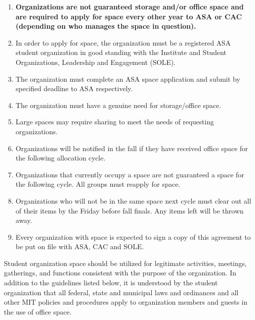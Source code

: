 \documentclass[12pt]{constitution}
\begin{document}
\begin{enumerate}
    \item \textbf{Organizations are not guaranteed storage and/or office space and are required to apply for
        space every other year to ASA or CAC (depending on who manages the space in question).}
    
    \item In order to apply for space, the organization must be a registered ASA student organization
        in good standing with the Institute and Student Organizations, Leadership and Engagement (SOLE).
    
    \item The organization must complete an ASA space application and submit by specified deadline to
        ASA respectively.

    \item The organization must have a genuine need for storage/office space.
    
    \item Large spaces may require sharing to meet the needs of requesting organizations.
    
    \item Organizations will be notified in the fall if they have received office space for the following
        allocation cycle.
    
    \item Organizations that currently occupy a space are not guaranteed a space for the following cycle.
        All groups must reapply for space.

    \item Organizations who will not be in the same space next cycle must clear out all of their items by
        the Friday before fall finals.
    Any items left will be thrown away.

    \item Every organization with space is expected to sign a copy of this agreement to be put on file
        with ASA, CAC and SOLE.
\end{enumerate}

Student organization space should be utilized for legitimate activities, meetings, gatherings, and functions consistent with the purpose of the organization. In addition to the guidelines listed below, it is understood by the student organization that all federal, state and municipal laws and ordinances and all other MIT policies and procedures apply to organization members and guests in the use of office space.
\end{document}
